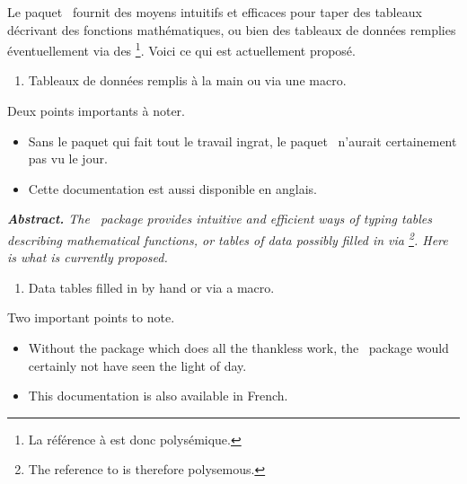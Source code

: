 \documentclass[10pt, a4paper]{article}
\begin{document}
\noindent
Le paquet \thispack\ fournit des moyens intuitifs et efficaces pour taper des tableaux décrivant des fonctions mathématiques, ou bien des tableaux de données remplies éventuellement via des 
\footnote{
	La référence à  est donc polysémique.
}.
Voici ce qui est actuellement proposé.
\begin{enumerate}
	\item Tableaux de données remplis à la main ou via une macro.

%
%
\end{enumerate}

\medskip

\noindent
Deux points importants à noter.
\begin{itemize}
    \item Sans le paquet  qui fait tout le travail ingrat, le paquet \thispack\ n'aurait certainement pas vu le jour.

    \item Cette documentation est aussi disponible en anglais.
\end{itemize}




\tdocsep

{\noindent
\small\itshape
\textbf{Abstract.}
The \thispack\ package provides intuitive and efficient ways of typing tables describing mathematical functions, or tables of data possibly filled in via 
\footnote{
	The reference to  is therefore polysemous.
}.
Here is what is currently proposed.
\begin{enumerate}
	\item Data tables filled in by hand or via a macro.

%
%
\end{enumerate}

\medskip

\noindent
Two important points to note.
\begin{itemize}
    \item Without the  package which does all the thankless work, the \thispack\ package would certainly not have seen the light of day.

    \item This documentation is also available in French.
\end{itemize}
}
\end{document}
